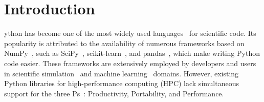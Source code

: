 \section{Introduction}
\label{sec:intro}


ython has become one of the most widely used languages~\cite{dace2021} for scientific code. Its popularity is attributed to the availability of numerous frameworks based on NumPy~\cite{harris2020array}, such as SciPy~\cite{2020SciPy-NMeth}, scikit-learn~\cite{scikit-learn}, and pandas~\cite{mckinney-proc-scipy-2010}, which make writing Python code easier. These frameworks are extensively employed by developers and users in scientific simulation~\cite{2016md_simulation, ziogas2019quantum} and machine learning~\cite{tensorflow2015-whitepaper,2019pytorch} domains. However, existing Python libraries for high-performance computing (HPC) lack simultaneous support for the three Ps~\cite{20203P,dace2021}: Productivity, Portability, and Performance.
 
